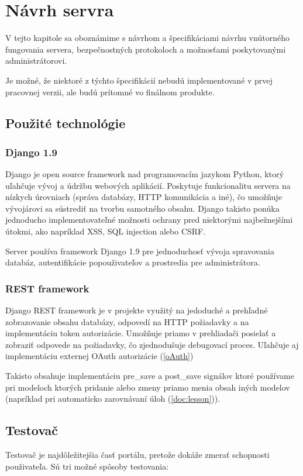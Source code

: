 \chapter{Návrh servra}

\label{kap:server}

V tejto kapitole sa oboznámime s návrhom a špecifikáciami návrhu vnútorného fungovania servera,
bezpečnostných protokoloch a možnosťami poskytovanými administrátorovi.

Je možné, že niektoré z týchto špecifikácií nebudú implementované v prvej pracovnej verzii,
ale budú prítomné vo finálnom produkte.

\section{Použité technológie}

\subsection{Django 1.9}
Django je open source framework nad programovacím jazykom Python, ktorý uľahčuje vývoj a údržbu webových aplikácií.
Poskytuje funkcionalitu servera na nízkych úrovniach (správa databázy, HTTP komunikácia a iné), čo umožňuje vývojárovi sa sústrediť na tvorbu samotného obsahu.
Django takisto ponúka jednoducho implementovateľné možnosti ochrany pred niektorými najbežnejšími útokmi, ako napríklad XSS, SQL injection alebo CSRF.

Server používa framework Django 1.9 pre jednoduchosť vývoja spravovania databáz, autentifikácie popouživateľov a prostredia pre administrátora.
\subsection{REST framework}
Django REST framework je v projekte využitý na jedoduché a prehľadné zobrazovanie obsahu databázy, odpovedí na HTTP požiadavky a na implementáciu
token autorizácie. Umožňuje priamo v prehliadači posielať a zobraziť odpovede na požiadavky, čo zjednodušuje debugovací proces. Uľahčuje aj implementáciu externej OAuth
autorizácie (\ref{oAuth})

Takisto obsahuje implementáciu pre\_save a post\_save signálov ktoré používame pri
modeloch ktorých pridanie alebo zmeny priamo menia obsah iných modelov
(napríklad pri automaticko zarovnávaní úloh (\ref{doc:lesson})).
\section{Testovač}
\label{testovace}
Testovač je najdôležitejšia časť portálu, pretože dokáže zmerať schopnosti použivateľa. Sú tri možné spôsoby testovania:
